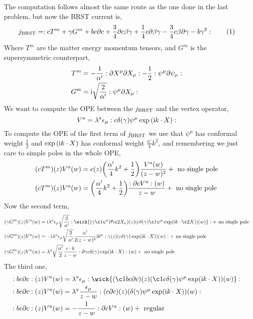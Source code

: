 \problem{}
\probitem{}

The computation follows almost the same route as the one done in the last problem, but now the BRST 
current is,
\[j_{\textnormal{BRST}}=\cnord{cT^m+\gamma G^m+bc\partial c+\frac34\partial c\beta\gamma+\frac14c\partial\beta\gamma-\frac34c\beta\partial\gamma-b\gamma^2}\numberthis\label{superbrstcurrent}\]
Where $T^m$ are the matter energy momentum tensors, and $G^m$ is the 
supersymmetric counterpart,
\begin{align*}
    T^m&=-\frac{1}{\alpha'}:\partial X^\mu\partial X_\mu:-\frac12:\psi^\mu\partial\psi_\mu:\\
    G^m&=\textnormal{i}\sqrt{\frac{2}{\alpha'}}:\psi^\mu\partial X_\mu:
\end{align*}
We want to compute the OPE between the $j_{\textnormal{BRST}}$ and the vertex operator,
\[V^a=\lambda^a\epsilon_\mu:c\delta\qty(\gamma)\psi^\mu\exp\qty(\textnormal{i} k\cdot X):\]
To compute the OPE of the first term of $j_{\textnormal{BRST}}$ we use that $\psi^\mu$ has conformal weight $\frac12$ and $\exp\qty(\textnormal{i} k\cdot X)$ has conformal 
weight $\frac{\alpha'}{4}k^2$, and remembering we just care to simple poles in the whole OPE,
\begin{align*}
    (cT^m)\qty(z)V^a\qty(w)&=c(z)\qty(\frac{\alpha'}{4}k^2+\frac12)\frac{V^a(w)}{(z-w)^2}+\textnormal{ no single pole}\\
    (cT^m)\qty(z)V^a\qty(w)&=\qty(\frac{\alpha'}{4}k^2+\frac12)\frac{:\partial cV^a:(w)}{z-w}+\textnormal{ no single pole}
\end{align*}
Now the second term,
\begin{align*}
    (\gamma G^m)(z)V^a(w)&=\im\lambda^a\epsilon_\mu\sqrt{\frac{2}{\alpha'}}\cnord{\wick{(\gamma\c1\psi^\nu\partial\c2 X_\nu)(z)( c\delta\qty(\gamma)\c1\psi^\mu\exp(\im k\cdot\c2 X))(w)}}+\textnormal{ no single pole}\\
    (\gamma G^m)(z)V^a(w)&=-\im\lambda^a\epsilon_\mu\sqrt{\frac{2}{\alpha'}}\frac{\alpha'}{2(z-w)^2}\im k^\mu\cnord{{\gamma(z)( c\delta\qty(\gamma)\exp(\im k\cdot X))(w)}}+\textnormal{ no single pole}\\
    (\gamma G^m)(z)V^a(w)&=\lambda^a\sqrt{\frac{\alpha'}{2}}\frac{\epsilon\cdot k}{z-w}\cnord{{\partial\gamma c\delta\qty(\gamma)\exp(\im k\cdot X)}}(w)+\textnormal{ no single pole}
\end{align*}
The third one,
\begin{align*}
    \cnord{bc\partial c}(z)V^a(w)&=\lambda^a\epsilon_\mu\cnord{\wick{(\c1bc\partial c)(z)(\c1c\delta\qty(\gamma)\psi^\mu\exp(\im k\cdot X))(w)}}\\
    \cnord{bc\partial c}(z)V^a(w)&=\lambda^a\frac{\epsilon_\mu}{z-w}\cnord{{(c\partial c)(z)(\delta\qty(\gamma)\psi^\mu\exp(\im k\cdot X))(w)}}\\
    \cnord{bc\partial c}(z)V^a(w)&=-\frac{1}{z-w}\cnord{\partial cV^a}(w)+\textnormal{ regular}
\end{align*}
